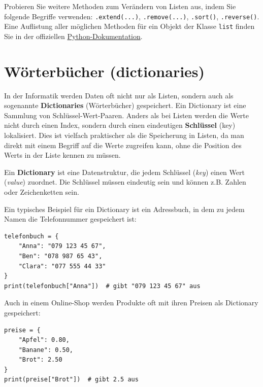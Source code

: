 \begin{mychallenge}
	Probieren Sie weitere Methoden zum Verändern von Listen aus, indem Sie folgende Begriffe verwenden: \lstinline|.extend(...)|, \lstinline|.remove(...)|, \lstinline|.sort()|, \lstinline|.reverse()|. Eine Auflistung aller möglichen Methoden für ein Objekt der Klasse \lstinline|list| finden Sie in der offiziellen \href{https://docs.python.org/3/tutorial/datastructures.html#more-on-lists}{Python-Dokumentation}.
\end{mychallenge}

\section{Wörterbücher (dictionaries)}
In der Informatik werden Daten oft nicht nur als Listen, sondern auch als sogenannte \textbf{Dictionaries} (Wörterbücher) gespeichert. Ein Dictionary ist eine Sammlung von Schlüssel-Wert-Paaren. Anders als bei Listen werden die Werte nicht durch einen Index, sondern durch einen eindeutigen \textbf{Schlüssel} (key) lokalisiert. Dies ist vielfach praktischer als die Speicherung in Listen, da man direkt mit einem Begriff auf die Werte zugreifen kann, ohne die Position des Werts in der Liste kennen zu müssen.

\begin{mydefinition}[Dictionary]
	Ein \textbf{Dictionary} ist eine Datenstruktur, die jedem Schlüssel (\textit{key}) einen Wert (\textit{value}) zuordnet. Die Schlüssel müssen eindeutig sein und können z.B. Zahlen oder Zeichenketten sein.
\end{mydefinition}

\begin{myexample}
	Ein typisches Beispiel für ein Dictionary ist ein Adressbuch, in dem zu jedem Namen die Telefonnummer gespeichert ist:

	\begin{lstlisting}
telefonbuch = {
    "Anna": "079 123 45 67",
    "Ben": "078 987 65 43",
    "Clara": "077 555 44 33"
}
print(telefonbuch["Anna"])  # gibt "079 123 45 67" aus
\end{lstlisting}
\end{myexample}

\begin{myexample}
	Auch in einem Online-Shop werden Produkte oft mit ihren Preisen als Dictionary gespeichert:
	\begin{lstlisting}
preise = {
    "Apfel": 0.80,
    "Banane": 0.50,
    "Brot": 2.50
}
print(preise["Brot"])  # gibt 2.5 aus
\end{lstlisting}
\end{myexample}


